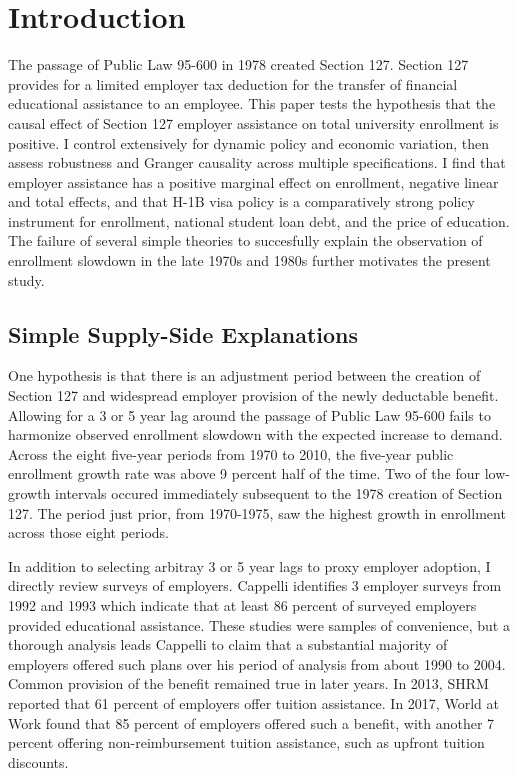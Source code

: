 \documentclass[review]{elsarticle}
\begin{document}
\pagebreak
\linenumbers

    \section{Introduction}
    The passage of Public Law 95-600 in 1978 created Section 127\cite{plaw95_600_1978}.
    Section 127 provides for a limited employer tax deduction for the transfer of financial educational assistance to an employee.
    This paper tests the hypothesis that the causal effect of Section 127 employer assistance on total university enrollment is positive.
    I control extensively for dynamic policy and economic variation, then assess robustness and Granger causality across multiple specifications.
    I find that employer assistance has a positive marginal effect on enrollment,
    negative linear and total effects,
    and that H-1B visa policy is a comparatively strong policy instrument for enrollment,
    national student loan debt, and the price of education.
    The failure of several simple theories to succesfully explain the observation of enrollment slowdown in the late 1970s and 1980s further motivates the present study.

    \subsection{Simple Supply-Side Explanations}
    One hypothesis is that there is an adjustment period between the creation of Section 127 and widespread employer provision of the newly deductable benefit.
    Allowing for a 3 or 5 year lag around the passage of Public Law 95-600 fails to harmonize observed enrollment slowdown with the expected increase to demand.
    Across the eight five-year periods from 1970 to 2010, the five-year public enrollment growth rate was above 9 percent half of the time.
    Two of the four low-growth intervals occured immediately subsequent to the 1978 creation of Section 127.
    The period just prior, from 1970-1975, saw the highest growth in enrollment across those eight periods.

    In addition to selecting arbitray 3 or 5 year lags to proxy employer adoption, I directly review surveys of employers.
    Cappelli\cite{cappelli2004employers} identifies 3 employer surveys from 1992 and 1993 which indicate that at least 86 percent of surveyed employers provided educational assistance.
    These studies were samples of convenience,
    but a thorough analysis leads Cappelli to claim that a substantial majority of employers offered such plans over his period of analysis from about 1990 to 2004.
    Common provision of the benefit remained true in later years.
    In 2013, SHRM reported that 61 percent of employers offer tuition assistance\cite{cherry2014rejuvenating}.
    In 2017, World at Work found that 85 percent of employers offered such a benefit,
    with another 7 percent offering non-reimbursement tuition assistance, such as upfront tuition discounts\cite{talentculture_2018}.
\end{document}
